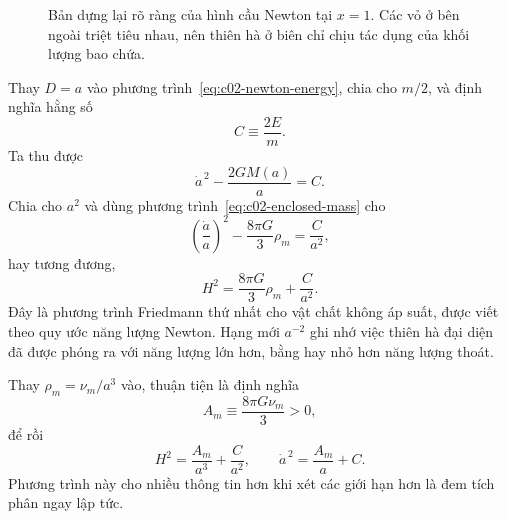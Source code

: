 \begin{figure}[ht]
\centering
{}
\caption{Bản dựng lại rõ ràng của hình cầu Newton tại \(x=1\). Các vỏ ở bên ngoài triệt tiêu nhau, nên thiên hà ở biên chỉ chịu tác dụng của khối lượng bao chứa.}
\label{fig:c02-sphere-redraw}
\end{figure}

Thay \(D=a\) vào phương trình~\eqref{eq:c02-newton-energy}, chia cho \(m/2\), và định nghĩa hằng số
\begin{equation}
C\equiv\frac{2E}{m}.
\end{equation}
Ta thu được
\begin{equation}
\dot a^{\,2}-\frac{2GM(a)}{a}=C.
\label{eq:c02-energy-a}
\end{equation}
Chia cho \(a^2\) và dùng phương trình~\eqref{eq:c02-enclosed-mass} cho
\begin{equation}
\left(\frac{\dot a}{a}\right)^2-
\frac{8\pi G}{3}\rho_m=\frac{C}{a^2},
\label{eq:c02-energy-form}
\end{equation}
hay tương đương,
\begin{equation}
\boxed{H^2=\frac{8\pi G}{3}\rho_m+\frac{C}{a^2}.}
\label{eq:c02-friedmann-C}
\end{equation}
Đây là phương trình Friedmann thứ nhất cho vật chất không áp suất, được viết theo quy ước năng lượng Newton. Hạng mới \(a^{-2}\) ghi nhớ việc thiên hà đại diện đã được phóng ra với năng lượng lớn hơn, bằng hay nhỏ hơn năng lượng thoát.

Thay \(\rho_m=\nu_m/a^3\) vào, thuận tiện là định nghĩa
\begin{equation}
A_m\equiv\frac{8\pi G\nu_m}{3}>0,
\end{equation}
để rồi
\begin{equation}
H^2=\frac{A_m}{a^3}+\frac{C}{a^2},
\qquad
\dot a^{\,2}=\frac{A_m}{a}+C.
\label{eq:c02-energy-branches}
\end{equation}
Phương trình này cho nhiều thông tin hơn khi xét các giới hạn hơn là đem tích phân ngay lập tức.

